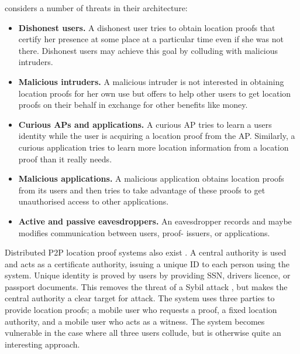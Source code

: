 \documentclass[12pt]{article}
\begin{document}
\cite{luo} considers a number of threats in their architecture:
\begin{itemize}
	\item \textbf{Dishonest users.} A dishonest user tries to obtain location proofs that certify her presence at some place at a particular time even if she was not there. Dishonest users may achieve this goal by colluding with malicious intruders.
	\item \textbf{Malicious intruders.} A malicious intruder is not interested in obtaining location proofs for her own use but offers to help other users to get location proofs on their behalf in exchange for other benefits like money.
	\item \textbf{Curious APs and applications.} A curious AP tries to learn a users identity while the user is acquiring a location proof from the AP. Similarly, a curious application tries to learn more location information from a location proof than it really needs.
	\item \textbf{Malicious applications.} A malicious application obtains location proofs from its users and then tries to take advantage of these proofs to get unauthorised access to other applications.
	\item \textbf{Active and passive eavesdroppers.} An eavesdropper records and maybe modifies communication between users, proof- issuers, or applications.
\end{itemize}

Distributed P2P location proof systems also exist \cite{khan}. A central authority is used and acts as a certificate authority, issuing a unique ID to each person using the system. Unique identity is proved by users by providing SSN, drivers licence, or passport documents. This removes the threat of a Sybil attack \cite{sybil}, but makes the central authority a clear target for attack. The system uses three parties to provide location proofs; a mobile user who requests a proof, a fixed location authority, and a mobile user who acts as a witness. The system becomes vulnerable in the case where all three users collude, but is otherwise quite an interesting approach.
\end{document}
